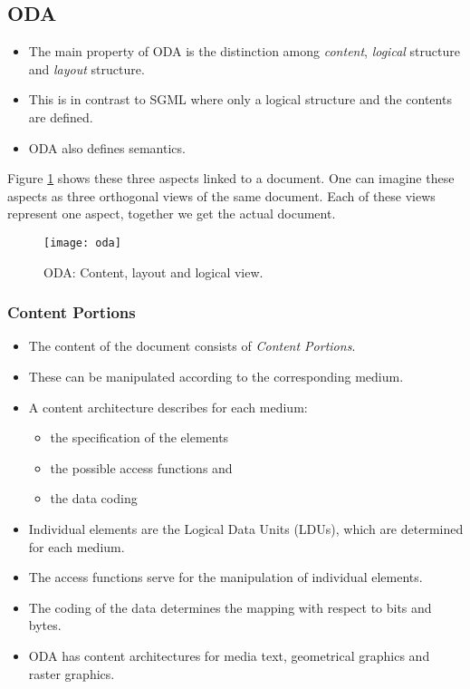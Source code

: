 \subsection*{ODA}
\begin{itemize}
\item The main property of ODA is the distinction among \textit{content}, \textit{logical} structure and \textit{layout} structure. 
\item This is in contrast to SGML where only a logical structure and the contents are defined. 
\item ODA also defines semantics. 
\end{itemize}
Figure {\ref{fig:oda}} shows these three aspects linked to a document. One can imagine these aspects as three orthogonal views of the same document. Each of these views represent one aspect, together we get the actual document.

\begin{figure}[hpb]
	\centering
	\texttt{[image: oda]}
	\caption{ODA: Content, layout and logical view.}{\label{fig:oda}}
\end{figure}


\begin{multicols}{2}
	\subsubsection*{Content Portions}
	\begin{itemize}
		\item The content of the document consists of \textit{Content Portions}. 
		\item These can be manipulated according to the corresponding medium.
		\item A content architecture describes for each medium:  
		\begin{itemize}
			\item the specification of the elements
			\item the possible access functions and
			\item the data coding
		\end{itemize}
		\item Individual elements are the Logical Data Units (LDUs), which are determined for each medium. 
		\item The access functions serve for the manipulation of individual elements. 
		\item The coding of the data determines the mapping with respect to bits and bytes.
		\item ODA has content architectures for media text, geometrical graphics and raster graphics.
	\end{itemize}
\end{multicols}




